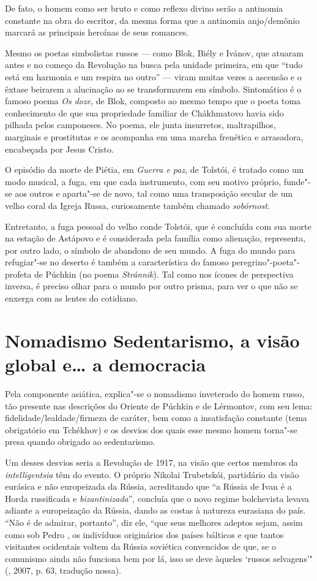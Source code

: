 De fato, o homem como ser bruto e como reflexo divino serão a antinomia constante na obra do escritor, da mesma forma que a antinomia anjo/demônio marcará as principais heroínas de seus romances.

Mesmo os poetas simbolistas russos --- como Blok, Biély e Ivánov, que atuaram antes e no começo da Revolução na busca pela unidade primeira, em que ``tudo está em harmonia e um respira no outro'' --- viram muitas vezes a ascensão e o êxtase beirarem a alucinação ao se transformarem em símbolo. Sintomático é o famoso poema \emph{Os doze}, de Blok, composto ao mesmo tempo que o poeta toma conhecimento de que sua propriedade familiar de Chákhmatovo havia sido pilhada pelos camponeses. No poema,
ele junta insurretos, maltrapilhos, marginais e prostitutas e os acompanha em uma marcha frenética e arrasadora, encabeçada por Jesus Cristo.

O episódio da morte de Piétia, em \emph{Guerra e paz}, de Tolstói, é tratado como um modo musical, a fuga, em que cada instrumento, com seu motivo próprio, funde"-se aos outros e aparta"-se de novo, tal como uma transposição secular de um velho coral da Igreja Russa, curiosamente também chamado \emph{sobórnost}.

Entretanto, a fuga pessoal do velho conde Tolstói, que é concluída com sua morte na estação de Astápovo e é considerada pela família como alienação, representa, por outro lado, o símbolo de abandono de seu mundo. A fuga do mundo para refugiar"-se no deserto é também a característica do famoso peregrino"-poeta"-profeta de Púchkin (no poema \emph{Stránnik}). Tal como nos ícones de perspectiva inversa, é preciso olhar para o mundo por outro prisma, para ver o que não se enxerga com as lentes do cotidiano.

\section{\uppercase{N}omadismo {} \uppercase{S}edentarismo, a visão global e\ldots{} a democracia}

Pela componente asiática, explica"-se o nomadismo inveterado do homem russo, tão presente nas descrições do Oriente de Púchkin e de Lérmontov, com seu lema: fidelidade/lealdade/firmeza de caráter, bem como a insatisfação constante (tema obrigatório em Tchékhov) e os desvios dos quais esse mesmo homem torna"-se presa quando obrigado ao sedentarismo.

Um desses desvios seria a Revolução de 1917, na visão que certos membros da \emph{intelligentsia} têm do evento. O próprio Nikolai Trubetskói, partidário da visão eurásica e não europeizada da Rússia, acreditando que ``a Rússia de Ivan  é a Horda russificada e \emph{bizantinizada}'', concluía que o novo regime bolchevista levava adiante a europeização da Rússia, dando as costas à natureza eurasiana do país. ``Não é de admirar, portanto'', diz ele, ``que seus melhores adeptos sejam, assim como sob Pedro , os indivíduos originários dos países bálticos e que tantos visitantes ocidentais voltem da Rússia
soviética convencidos de que, se o comunismo ainda não funciona bem por lá, isso se deve àqueles `russos selvagens'" (, 2007, p. 63, tradução nossa).

